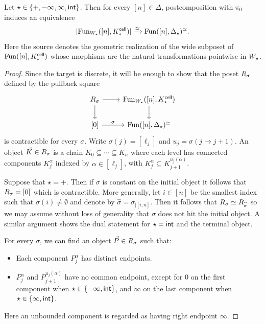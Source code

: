 \documentclass[a4paper,reqno,twoside]{amsart}
\begin{document}
\begin{proposition}\label{prop:assemblpart1}
	Let $\star \in \{+, -\infty,\infty, \mathsf{int} \}$. Then for every $[n] \in \Delta$, postcomposition with $\pi_0$ induces an equivalence
	\[
		|\mathrm{Fun}_{\relax{W}_\star}([n],\relax{K}_\star^{\mathsf{cell}})| \xrightarrow{\simeq} \mathrm{Fun}([n],\Delta_\star)^{\simeq}.
	\]
	Here the source denotes the geometric realization of the wide subposet of $\mathrm{Fun}([n],\relax{K}_\star^{\mathsf{cell}})$ whose morphisms are the natural transformations pointwise in $\relax{W}_{\star}$.
\end{proposition}
\begin{proof}
	Since the target is discrete, it will be enough to show that the poset $\relax{R}_{\sigma}$ defined by the pullback square
	\[
		\begin{tikzcd}
			\cR_{\sigma} \arrow[r] \arrow[d] & \Fun_{\cW_\star}({[n]},\cK_\star^{\cell}) \arrow[d] \\
			{[0]} \arrow[r,"\sigma"] & \Fun([n],\Delta_\star)^{\simeq}
		\end{tikzcd}
	\]
	is contractible for every $\sigma$. Write $\sigma(j)=[\ell_j]$ and $u_j=\sigma(j\to j+1)$. An object $\vec K\in\relax{R}_\sigma$ is a chain $K_0\subseteq\cdots\subseteq K_n$ where each level has connected components $K_j^\alpha$ indexed by $\alpha\in[\ell_j]$, with $K_j^\alpha\subseteq K_{j+1}^{u_j(\alpha)}$.

    Suppose that $\star=+$. Then if $\sigma$ is constant on the initial object it follows that $\relax{R}_\sigma=[0]$ which is contractible. More generally, let $i \in [n]$ be the smallest index such that $\sigma(i)\neq \emptyset$ and denote by $\widehat{\sigma}=\sigma_{|[i,n]}$. Then it follows that $\relax{R}_{\sigma}\simeq \relax{R}_{\widehat{\sigma}}$ so we may assume without loss of generality that $\sigma$ does not hit the initial object. A similar argument shows the dual statement for $\star=\mathsf{int}$ and the terminal object. 


	For every $\sigma$, we can find an object $\vec P\in\relax{R}_\sigma$ such that:
\begin{itemize}
    \item Each component $P_j^\alpha$ has distinct endpoints.
    \item $P_j^\alpha$ and $P_{j+1}^{u_j(\alpha)}$ have no common endpoint, except for $0$ on the first component when $\star\in\{-\infty,\mathsf{int}\}$, and $\infty$ on the last component when $\star\in\{\infty,\mathsf{int}\}$.
\end{itemize}
Here an unbounded component is regarded as having right endpoint $\infty$. 


\end{proof}
\end{document}
